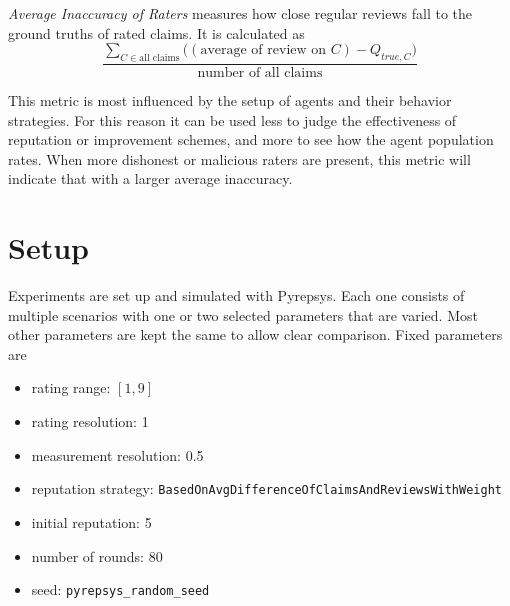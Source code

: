 \documentclass[%
    ]{\PathToTumTemplate/thesis/tum_thesis}
\begin{document}
\vspace{6pt}

\emph{Average Inaccuracy of Raters} measures how close regular reviews fall to the ground truths of rated claims.
It is calculated as
\begin{equation}
\frac{\sum_{C\in\text{all claims}}({(\text{average of review on }C) - Q_{true,C})}}{\text{number of all claims}}
\end{equation}

This metric is most influenced by the setup of agents and their behavior strategies.
For this reason it can be used less to judge the effectiveness of reputation or improvement schemes, and more to see how the agent population rates.
When more dishonest or malicious raters are present, this metric will indicate that with a larger average inaccuracy.



\section{Setup}\label{sec:setup}

Experiments are set up and simulated with Pyrepsys.
Each one consists of multiple scenarios with one or two selected parameters that are varied.
Most other parameters are kept the same to allow clear comparison.
Fixed parameters are
\begin{itemize}
	\item rating range: $[1,9]$
	\item rating resolution: 1
	\item measurement resolution: 0.5
	\item reputation strategy: \lstinline{BasedOnAvgDifferenceOfClaimsAndReviewsWithWeight}
	\item initial reputation: 5
	\item number of rounds: 80
	\item seed: \lstinline{pyrepsys_random_seed}
\end{itemize}
\end{document}
